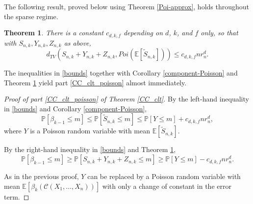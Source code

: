 \documentclass{amsart}
\newtheorem{thm}{Theorem}[section]
\theoremstyle{definition}
\newcommand{\E}{\mathbb{E}}
\renewcommand{\P}{\mathbb{P}}
\newcommand{\s}{\widetilde{S}}
\renewcommand{\1}{\mathbb{1}}
\begin{document}
\medskip

 The
following result, proved below using Theorem \ref{Poi-approx}, 
holds throughout the sparse regime.

\begin{thm}\label{upper-Poisson}
There is a constant $c_{d,k,f}$ depending on $d$, $k$, and $f$ only,
so that with $S_{n,k},Y_{n,k},Z_{n,k}$ as above, 
$$d_{TV}(S_{n,k}+Y_{n,k}+Z_{n,k}, Poi(\E[\s_{n,k}]))\le c_{d,k,f}nr_n^d.$$
\end{thm}

The inequalities in \eqref{bounds} together with Corollary 
\ref{component-Poisson} and Theorem \ref{upper-Poisson} yield part 
\ref{CC_clt_poisson} almost immediately.

\begin{proof}[Proof of part \ref{CC_clt_poisson} of Theorem \ref{CC_clt}]
By the left-hand inequality in \eqref{bounds} and Corollary 
\ref{component-Poisson},
$$\P[\beta_{k-1}\le m]\le\P[\s_{n,k}\le m]\le \P[Y\le m]+c_{d,k,f}nr_n^d,$$
 where $Y$ is a Poisson random variable with mean $\E[\s_{n,k}]$.

By the right-hand inequality in \eqref{bounds} and Theorem 
\ref{upper-Poisson}, 
$$\P[\beta_{k-1}\le m]\ge\P[S_{n,k}+Y_{n,k}+Z_{n,k}\le m]\ge \P[Y\le m]-
c_{d,k,f}nr_n^d.$$

 As in the previous proof, $Y$ can be replaced by a Poisson random variable
with mean $\E[\beta_k(\mathcal{C}(X_1,\ldots,X_n))]$ with only a change of 
constant in the error term.
\end{proof}
\end{document}
